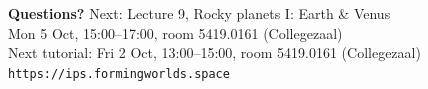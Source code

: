 \documentclass[aspectratio=169, 11pt]{beamer}
\begin{document}
\begin{frame}
  \vfill
  \begin{center}
    {\color{white}\Large\bfseries Questions?}
    \vskip20pt
    {\color{white!85}\large Next: Lecture 9, Rocky planets I: Earth \& Venus}\\[4pt]
    {\color{white!85}\small Mon 5 Oct, 15:00--17:00, room 5419.0161 (Collegezaal)}\\[12pt]
    {\color{white!85}\small Next tutorial: Fri 2 Oct, 13:00--15:00, room 5419.0161 (Collegezaal)}\\[20pt]
    {\color{white!70}\small \texttt{https://ips.formingworlds.space}}
  \end{center}
  \vfill
\end{frame}
\end{document}
